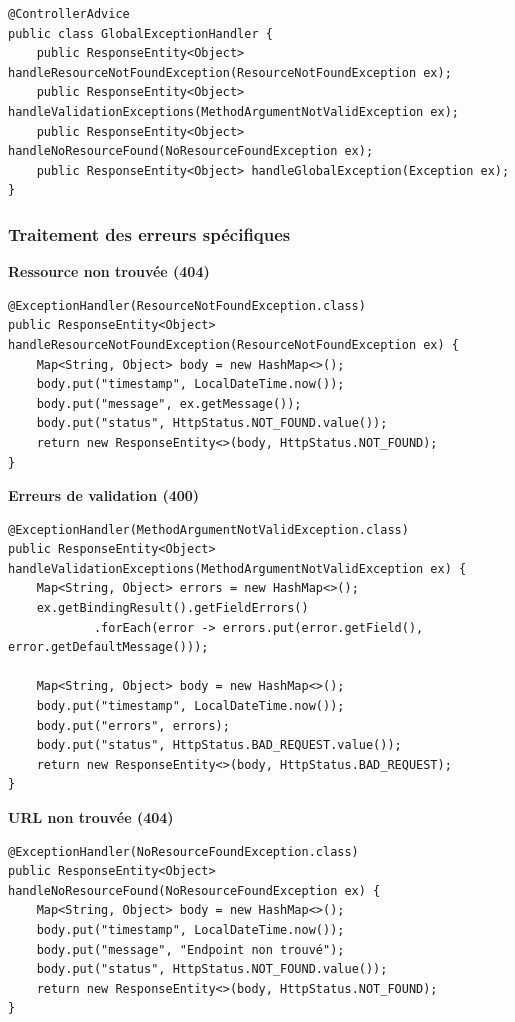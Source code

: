 \documentclass[12pt,a4paper,french]{article}
\begin{document}
\begin{tcolorbox}[projectbox, title=Signature de GlobalExceptionHandler.java]
    \begin{verbatim}
@ControllerAdvice
public class GlobalExceptionHandler {
    public ResponseEntity<Object> handleResourceNotFoundException(ResourceNotFoundException ex);
    public ResponseEntity<Object> handleValidationExceptions(MethodArgumentNotValidException ex);
    public ResponseEntity<Object> handleNoResourceFound(NoResourceFoundException ex);
    public ResponseEntity<Object> handleGlobalException(Exception ex);
}
\end{verbatim}
\end{tcolorbox}

\subsubsection{Traitement des erreurs spécifiques}

\textbf{Ressource non trouvée (404)}
\begin{verbatim}
@ExceptionHandler(ResourceNotFoundException.class)
public ResponseEntity<Object> handleResourceNotFoundException(ResourceNotFoundException ex) {
    Map<String, Object> body = new HashMap<>();
    body.put("timestamp", LocalDateTime.now());
    body.put("message", ex.getMessage());
    body.put("status", HttpStatus.NOT_FOUND.value());
    return new ResponseEntity<>(body, HttpStatus.NOT_FOUND);
}
\end{verbatim}

\vspace{1em}
\textbf{Erreurs de validation (400)}
\begin{verbatim}
@ExceptionHandler(MethodArgumentNotValidException.class)
public ResponseEntity<Object> handleValidationExceptions(MethodArgumentNotValidException ex) {
    Map<String, Object> errors = new HashMap<>();
    ex.getBindingResult().getFieldErrors()
            .forEach(error -> errors.put(error.getField(), error.getDefaultMessage()));

    Map<String, Object> body = new HashMap<>();
    body.put("timestamp", LocalDateTime.now());
    body.put("errors", errors);
    body.put("status", HttpStatus.BAD_REQUEST.value());
    return new ResponseEntity<>(body, HttpStatus.BAD_REQUEST);
}
\end{verbatim}

\vspace{1em}
\textbf{URL non trouvée (404)}
\begin{verbatim}
@ExceptionHandler(NoResourceFoundException.class)
public ResponseEntity<Object> handleNoResourceFound(NoResourceFoundException ex) {
    Map<String, Object> body = new HashMap<>();
    body.put("timestamp", LocalDateTime.now());
    body.put("message", "Endpoint non trouvé");
    body.put("status", HttpStatus.NOT_FOUND.value());
    return new ResponseEntity<>(body, HttpStatus.NOT_FOUND);
}
\end{verbatim}
\end{document}
